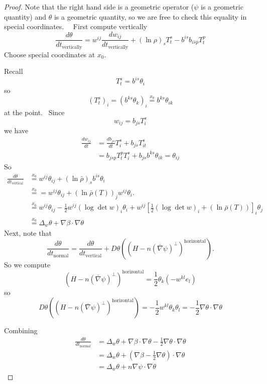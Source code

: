 \documentclass[12pt,letterpaper]{amsart}%
\numberwithin{mycounter}{section}
\theoremstyle{plain}
\numberwithin{equation}{section}
\theoremstyle{definition}
\begin{document}
\begin{proof}
Note that the right hand side is a geometric operator ($\psi$ is a geometric quantity) and
$\theta$ is a geometric quantity, so we are free to check this equality in
special coordinates. \ \ First compute vertically
\[
\frac{d\theta}{dt_{\text{vertically}}} = w^{ij} \frac{dw_{ij}}{dt_{\text{vertically}}}
+ \left( \ln \rho \right)_s T_t^s - b^{is} b_{i\bar{s}\bar{p}} T_t^p
\]
Choose special coordinates at $x_{0}.$

Recall
\[
T_{t}^{s}=b^{is}\theta_{i}%
\]
so
\[
\left(  T_{t}^{s}\right)  _{i}=\left(  b^{ks}\theta_{k}\right)  _{i}%
\overset{ x_0}{=}b^{ks}\theta_{ik}%
\]
at the point. \ Since
\[
w_{ij}=b_{js}T_{i}^{s}%
\]
we have
\begin{align*}
\frac{dw_{ij}}{dt} &  =\frac{db_{js}}{dt}T_{i}^{s}+b_{js}T_{it}^{s}\\
&  =b_{jsp}T_{t}^{p}T_{i}^{s}+b_{js}b^{ks}\theta_{ik}=\theta_{ij}%
\end{align*}
So
\begin{align*}
 \frac{d\theta}{dt_{\text{vertical}}} &\overset{ x_0}{=}w^{ij}\theta_{ij}+\left(  \ln\bar{\rho}\right)
_{s}b^{is}\theta_{i}\\
& \overset{ x_0}{=}=w^{ij}\theta_{ij}+\left(  \ln\bar{\rho}\left(  T\right)  \right)
_{j}w^{ij}\theta_{i}.\\
& \overset{ x_0}{=}w^{ij}\theta_{ij}-\frac{1}{2}w^{ij}(\log\det w)_{i}\theta_{i}+w^{ij}\left[
\frac{1}{2}(\log\det w)_{i}+\left(  \ln\bar{\rho}\left(  T\right)  \right)
\right]  _{i}\theta_{j}\\
& \overset{ x_0}{=}\Delta_{w}\theta+\nabla\beta\cdot\nabla\theta
\end{align*}
Next, note that%
\[
\frac{d\theta}{dt_{\text{normal}}} = \frac{d\theta}{dt_{\text{vertical}}}
+ D\theta\left( \left( H - n\left( \bar{\nabla}\psi \right)^{\perp} \right)^{\text{horizontal}} \right).
\]
So we compute
\[
\left(  H-n\left(  \bar{\nabla}\psi\right)  ^{\perp}\right)
^{\text{horizontal}}=\frac{1}{2}\theta_{k}(-w^{kl}e_{l})
\]
so
\[
D\theta\left(  \left(  H-n\left(  \bar{\nabla}\psi\right)  ^{\perp}\right)
^{\text{horizontal}}\right)  =-\frac{1}{2}w^{kl}\theta_{k}\theta_{l}=-\frac
{1}{2}\nabla\theta\cdot\nabla\theta
\]

Combining
\begin{align*}\frac{d\theta}{dt_{\text{normal}}}  & =\Delta_{w}\theta+\nabla\beta\cdot\nabla\theta-\frac
{1}{2}\nabla\theta\cdot\nabla\theta\\
& =\Delta_{w}\theta+\left(  \nabla\beta-\frac{1}{2}\nabla\theta\right)
\cdot\nabla\theta\\
& =\Delta_{w}\theta+n\nabla\psi\cdot\nabla\theta
\end{align*}
\end{proof}
\end{document}
